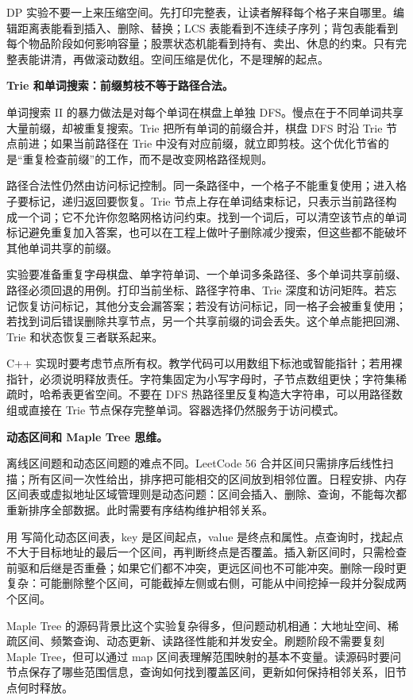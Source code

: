 DP 实验不要一上来压缩空间。先打印完整表，让读者解释每个格子来自哪里。编辑距离表能看到插入、删除、替换；LCS 表能看到不连续子序列；背包表能看到每个物品阶段如何影响容量；股票状态机能看到持有、卖出、休息的约束。只有完整表能讲清，再做滚动数组。空间压缩是优化，不是理解的起点。

\noindent\textbf{Trie 和单词搜索：前缀剪枝不等于路径合法。}

单词搜索 II 的暴力做法是对每个单词在棋盘上单独 DFS。慢点在于不同单词共享大量前缀，却被重复搜索。Trie 把所有单词的前缀合并，棋盘 DFS 时沿 Trie 节点前进；如果当前路径在 Trie 中没有对应前缀，就立即剪枝。这个优化节省的是“重复检查前缀”的工作，而不是改变网格路径规则。

路径合法性仍然由访问标记控制。同一条路径中，一个格子不能重复使用；进入格子要标记，递归返回要恢复。Trie 节点上存在单词结束标记，只表示当前路径构成一个词；它不允许你忽略网格访问约束。找到一个词后，可以清空该节点的单词标记避免重复加入答案，也可以在工程上做叶子删除减少搜索，但这些都不能破坏其他单词共享的前缀。

实验要准备重复字母棋盘、单字符单词、一个单词多条路径、多个单词共享前缀、路径必须回退的用例。打印当前坐标、路径字符串、Trie 深度和访问矩阵。若忘记恢复访问标记，其他分支会漏答案；若没有访问标记，同一格子会被重复使用；若找到词后错误删除共享节点，另一个共享前缀的词会丢失。这个单点能把回溯、Trie 和状态恢复三者联系起来。

C++ 实现时要考虑节点所有权。教学代码可以用数组下标池或智能指针；若用裸指针，必须说明释放责任。字符集固定为小写字母时，子节点数组更快；字符集稀疏时，哈希表更省空间。不要在 DFS 热路径里反复构造大字符串，可以用路径数组或直接在 Trie 节点保存完整单词。容器选择仍然服务于访问模式。

\noindent\textbf{动态区间和 Maple Tree 思维。}

离线区间题和动态区间题的难点不同。LeetCode 56 合并区间只需排序后线性扫描；所有区间一次性给出，排序把可能相交的区间放到相邻位置。日程安排、内存区间表或虚拟地址区域管理则是动态问题：区间会插入、删除、查询，不能每次都重新排序全部数据。此时需要有序结构维护相邻关系。

用  写简化动态区间表，key 是区间起点，value 是终点和属性。点查询时，找起点不大于目标地址的最后一个区间，再判断终点是否覆盖。插入新区间时，只需检查前驱和后继是否重叠；如果它们都不冲突，更远区间也不可能冲突。删除一段时更复杂：可能删除整个区间，可能截掉左侧或右侧，可能从中间挖掉一段并分裂成两个区间。

Maple Tree 的源码背景比这个实验复杂得多，但问题动机相通：大地址空间、稀疏区间、频繁查询、动态更新、读路径性能和并发安全。刷题阶段不需要复刻 Maple Tree，但可以通过 map 区间表理解范围映射的基本不变量。读源码时要问节点保存了哪些范围信息，查询如何找到覆盖区间，更新如何保持相邻关系，旧节点何时释放。

